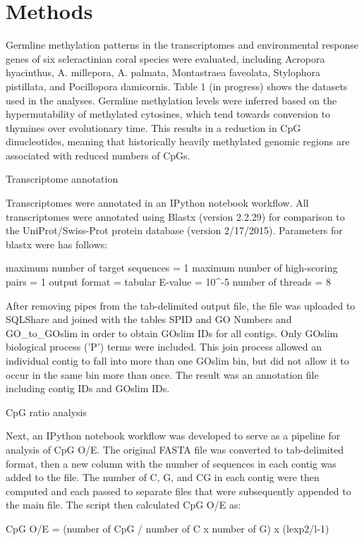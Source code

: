 \section{Methods}


Germline methylation patterns in the transcriptomes and environmental response genes of six scleractinian coral species were evaluated, including Acropora hyacinthus, A. millepora, A. palmata, Montastraea faveolata, Stylophora pistillata, and Pocillopora damicornis. Table 1 (in progress) shows the datasets used in the analyses. Germline methylation levels were inferred based on the hypermutability of methylated cytosines, which tend towards conversion to thymines over evolutionary time. This results in a reduction in CpG dinucleotides, meaning that historically heavily methylated genomic regions are associated with reduced numbers of CpGs. 

Transcriptome annotation

Transcriptomes were annotated in an IPython notebook workflow. All transcriptomes were annotated using Blastx (version 2.2.29) for comparison to the UniProt/Swiss-Prot protein database (version 2/17/2015). Parameters for blastx were has follows:

    maximum number of target sequences = 1
    maximum number of high-scoring pairs = 1
    output format = tabular
    E-value = 10^-5
    number of threads = 8

After removing pipes from the tab-delimited output file, the file was uploaded to SQLShare and joined with the tables SPID and GO Numbers and GO_to_GOslim in order to obtain GOslim IDs for all contigs. Only GOslim biological process ('P') terms were included. This join process allowed an individual contig to fall into more than one GOslim bin, but did not allow it to occur in the same bin more than once. The result was an annotation file including contig IDs and GOslim IDs.

CpG ratio analysis

Next, an IPython notebook workflow was developed to serve as a pipeline for analysis of CpG O/E. The original FASTA file was converted to tab-delimited format, then a new column with the number of sequences in each contig was added to the file. The number of C, G, and CG in each contig were then computed and each passed to separate files that were subsequently appended to the main file. The script then calculated CpG O/E as:

CpG O/E = (number of CpG / number of C x number of G) x (lexp2/l-1)

